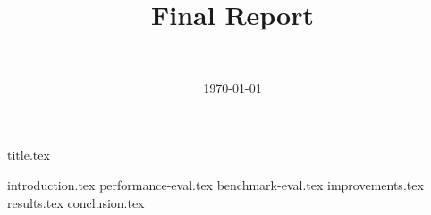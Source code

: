 \documentclass[final]{article}
\title{Final Report}
\author{~}
\date{\today}
\begin{document}

{title.tex}
\newpage

\tableofcontents
\newpage

{introduction.tex}
{performance-eval.tex}
{benchmark-eval.tex}
{improvements.tex}
{results.tex}
{conclusion.tex}
\newpage
{}

\printbibliography
\end{document}
